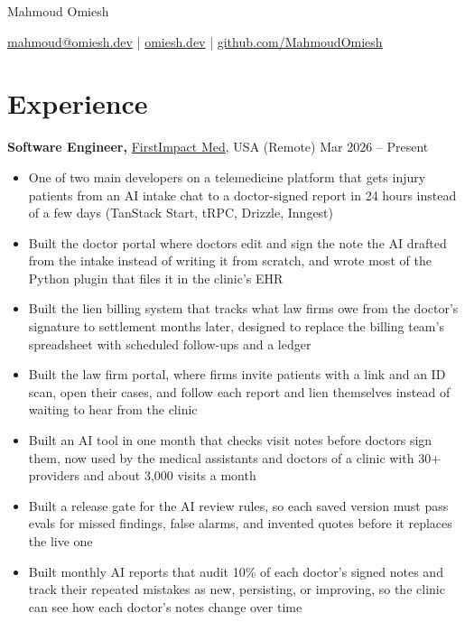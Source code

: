 \documentclass[11pt]{article}       %
\begin{document}
\centerline{\Huge Mahmoud Omiesh}

\vspace{5pt}

\centerline{\href{mailto:mahmoud@omiesh.dev}{mahmoud@omiesh.dev} | \href{https://omiesh.dev}{omiesh.dev} | \href{https://github.com/MahmoudOmiesh}{github.com/MahmoudOmiesh}}

\vspace{-10pt}

\section*{Experience}
\textbf{Software Engineer,} \href{https://firstimpactmed.com/}{FirstImpact Med}, USA (Remote) \hfill Mar 2026 -- Present \\
\vspace{-9pt}
\begin{itemize}
    \item One of two main developers on a telemedicine platform that gets injury patients from an AI intake chat to a doctor-signed report in 24 hours instead of a few days (TanStack Start, tRPC, Drizzle, Inngest)
    \item Built the doctor portal where doctors edit and sign the note the AI drafted from the intake instead of writing it from scratch, and wrote most of the Python plugin that files it in the clinic's EHR
    \item Built the lien billing system that tracks what law firms owe from the doctor's signature to settlement months later, designed to replace the billing team's spreadsheet with scheduled follow-ups and a ledger
    \item Built the law firm portal, where firms invite patients with a link and an ID scan, open their cases, and follow each report and lien themselves instead of waiting to hear from the clinic
    \item Built an AI tool in one month that checks visit notes before doctors sign them, now used by the medical assistants and doctors of a clinic with 30+ providers and about 3,000 visits a month
    \item Built a release gate for the AI review rules, so each saved version must pass evals for missed findings, false alarms, and invented quotes before it replaces the live one
    \item Built monthly AI reports that audit 10\% of each doctor's signed notes and track their repeated mistakes as new, persisting, or improving, so the clinic can see how each doctor's notes change over time
\end{itemize}
\end{document}
